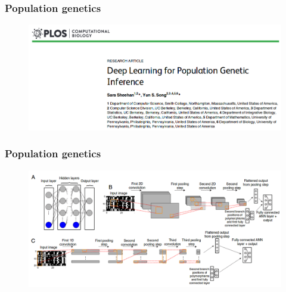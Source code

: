 \begin{frame}
        \frametitle{Population genetics}

        \begin{figure}
                        \includegraphics[width=1\textwidth]{Pics/sara.png}
        \end{figure}

\end{frame}

\begin{frame}
        \frametitle{Population genetics}

        \begin{figure}
                        \includegraphics[width=1\textwidth]{Pics/flagel.png}
        \end{figure}

\end{frame}


